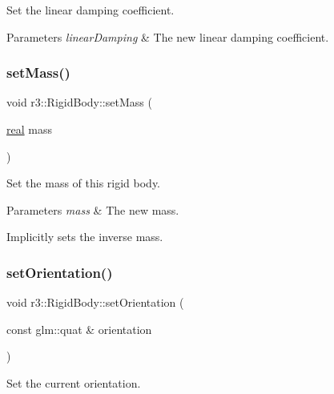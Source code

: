 Set the linear damping coefficient. 


\begin{DoxyParams}{Parameters}
{\em linear\+Damping} & The new linear damping coefficient. \\
\hline
\end{DoxyParams}
\mbox{\label{classr3_1_1_rigid_body_a84c88437d863261773c9514d87bbc56a}} 
\subsubsection{\texorpdfstring{set\+Mass()}{setMass()}}
{\footnotesize\ttfamily void r3\+::\+Rigid\+Body\+::set\+Mass (\begin{DoxyParamCaption}\item[{\mbox{\hyperlink{namespacer3_ab2016b3e3f743fb735afce242f0dc1eb}{real}}}]{mass }\end{DoxyParamCaption})}



Set the mass of this rigid body. 


\begin{DoxyParams}{Parameters}
{\em mass} & The new mass.\\
\hline
\end{DoxyParams}
Implicitly sets the inverse mass. \mbox{\label{classr3_1_1_rigid_body_a2a93ca6f386411f14e5e8b844c214573}} 
\subsubsection{\texorpdfstring{set\+Orientation()}{setOrientation()}\hspace{0.1cm}{\footnotesize\ttfamily [1/2]}}
{\footnotesize\ttfamily void r3\+::\+Rigid\+Body\+::set\+Orientation (\begin{DoxyParamCaption}\item[{const glm\+::quat \&}]{orientation }\end{DoxyParamCaption})}



Set the current orientation. 


